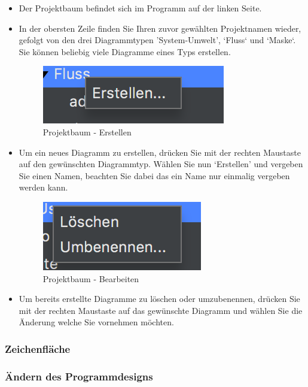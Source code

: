 \begin{itemize}
\item Der Projektbaum befindet sich im Programm auf der linken Seite.
\item In der obersten Zeile finden Sie Ihren zuvor gewählten Projektnamen wieder, gefolgt von den drei Diagrammtypen 'System-Umwelt', ‘Fluss‘ und ‘Maske‘. Sie können beliebig viele Diagramme eines Typs erstellen.

\begin{figure}[h!]
	\centering
	\includegraphics[width=.4\textwidth]{Projektbaum_Erstellen.png}
	\caption{Projektbaum - Erstellen}
\end{figure}

\item Um ein neues Diagramm zu erstellen, drücken Sie mit der rechten Maustaste auf den gewünschten Diagrammtyp. Wählen Sie nun ‘Erstellen' und vergeben Sie einen Namen, beachten Sie dabei das ein Name nur einmalig vergeben werden kann. 

\begin{figure}[h!]
	\centering
	\includegraphics[width=.4\textwidth]{Projektbaum_Bearbeiten.png}
	\caption{Projektbaum - Bearbeiten}
\end{figure}

\item Um bereits erstellte Diagramme zu löschen oder umzubenennen, drücken Sie mit der rechten Maustaste auf das gewünschte Diagramm und wählen Sie die Änderung welche Sie vornehmen möchten.
\end{itemize}

\subsubsection{Zeichenfläche}
\subsubsection{Ändern des Programmdesigns}

